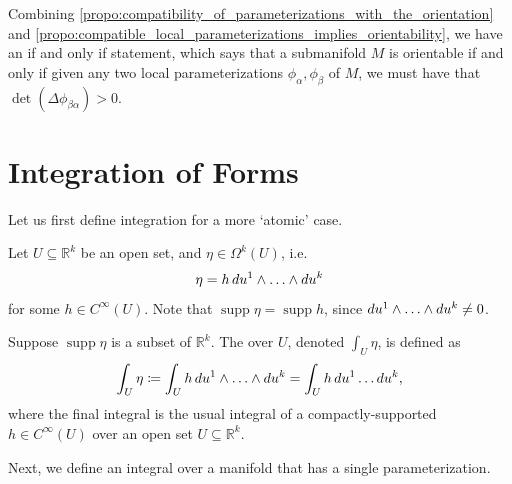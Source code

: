 \documentclass[notoc,notitlepage]{tufte-book}
\DeclareMathOperator{\supp}{supp}
\begin{document}
\begin{note}\label{note:equivalent_definition_of_an_oriented_manifold}
  Combining \cref{propo:compatibility_of_parameterizations_with_the_orientation}
  and \cref{propo:compatible_local_parameterizations_implies_orientability}, we
  have an if and only if statement, which says that a submanifold $M$ is
  orientable if and only if given any two local parameterizations $\phi_\alpha,
  \phi_\beta$ of $M$, we must have that $\det (\Delta \phi_{\beta\alpha}) > 0$.
\end{note}


\section{Integration of Forms}%
\label{sec:integration_of_forms}

Let us first define integration for a more `atomic' case.

\begin{defn}\label{defn:integration_of_forms_on_r_k_} 
  Let $U \subseteq \mathbb{R}^k$ be an open set, and $\eta \in \Omega^k(U)$,
  i.e.
  \begin{equation*}
    \eta = h \mathop{}\!d{u^1} \land \hdots \land \mathop{}\!d{u^k}
  \end{equation*}
  for some $h \in C^\infty(U)$. Note that $\supp \eta = \supp h$, since
  $\mathop{}\!d{u^1} \land \hdots \land \mathop{}\!d{u^k} \neq 0$. 

  Suppose $\supp \eta$ is a  subset of $\mathbb{R}^k$. The
   over $U$, denoted $\int_{U} \eta$, is defined as
  \begin{equation*}
    \int_{U} \eta \coloneqq \int_{U} h \mathop{}\!d{u^1} \land \hdots \land \mathop{}\!d{u^k} =
    \int_{U} h \mathop{}\!d{u^1} \hdots \mathop{}\!d{u^k},
  \end{equation*}
  where the final integral is the usual integral of a compactly-supported $h \in
  C^\infty(U)$ over an open set $U \subseteq \mathbb{R}^k$.
\end{defn}

Next, we define an integral over a manifold that has a single parameterization.
\end{document}
